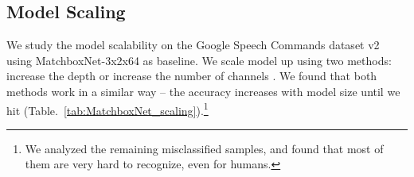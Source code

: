 \documentclass[a4paper]{article}
\begin{document}
{\renewcommand{\arraystretch}{1.1}
\begin{table}[!h]
\caption{MatchboxNet on Google Speech Commands dataset v2, the accuracy is averaged over 5 trials (95\% Confidence Interval).}
\label{tab:QuartzNet_Scores_v2}
\centering
{}
\end{table}
}

\subsection{Model Scaling}
We study the model scalability on the Google Speech Commands dataset v2 using MatchboxNet-3x2x64 as baseline. We scale model up using two methods: increase the depth  or increase the number of channels . We found that both methods work in a similar way -- the accuracy increases with model size until we hit  (Table.~\ref{tab:MatchboxNet_scaling}).\footnote{We analyzed the remaining misclassified samples, and found that most of them are very hard to recognize, even for humans.}

{\renewcommand{\arraystretch}{1.1}
\begin{table}[!h]
\caption{Scaling up MatchboxNet depth and number of channels, Speech Commands Dataset v2}
\label{tab:MatchboxNet_scaling}
\centering
{}
\end{table}
}
\end{document}
